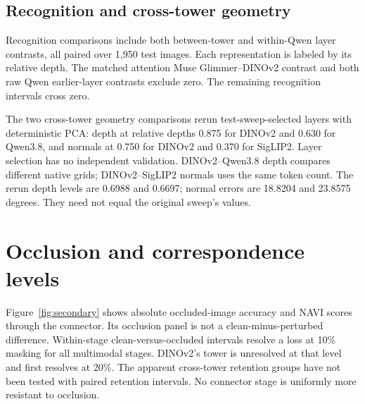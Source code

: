 \begin{table}[H]
\centering\small
\caption{KITTI projected-versus-tower differences.}
\label{tab:kitti}

\end{table}
\begin{table}[H]
\centering\small
\caption{NAVI projected-versus-tower differences.}

\end{table}
\begin{table}[H]
\centering\small
\caption{ScanNet projected-versus-tower differences.}

\end{table}
\begin{table}[H]
\centering\small
\caption{SPair-71k projected-versus-tower differences.}

\end{table}

\subsection{Recognition and cross-tower geometry}
Recognition comparisons include both between-tower and within-Qwen layer contrasts,
all paired over 1,950 test images. Each representation is labeled by its relative depth.
The matched attention Muse Glimmer--DINOv2 contrast and both raw Qwen earlier-layer
contrasts exclude zero. The remaining recognition intervals cross zero.

\begin{table}[H]
\centering\scriptsize
\caption{Recognition differences, first minus second top-1 accuracy.}

\end{table}

The two cross-tower geometry comparisons rerun test-sweep-selected layers with
deterministic PCA: depth at relative depths 0.875 for DINOv2 and 0.630 for Qwen3.8,
and normals at 0.750 for DINOv2 and 0.370 for SigLIP2. Layer selection has no independent
validation. DINOv2--Qwen3.8 depth compares different native grids; DINOv2--SigLIP2 normals
uses the same token count. The rerun depth levels are 0.6988 and 0.6697; normal errors
are 18.8204 and 23.8575 degrees. They need not equal the original sweep's values.

\begin{table}[H]
\centering\small
\caption{Cross-tower geometry advantages under deterministic matched reruns.}

\end{table}

\section{Occlusion and correspondence levels}
\label{app:secondary}
Figure~\ref{fig:secondary} shows absolute occluded-image accuracy and NAVI scores through
the connector. Its occlusion panel is not a clean-minus-perturbed difference.
Within-stage clean-versus-occluded intervals resolve a loss at 10\% masking for all
multimodal stages. DINOv2's tower is unresolved at that level and first resolves at
20\%. The apparent cross-tower retention groups have not been tested with paired
retention intervals. No connector stage is uniformly more resistant to occlusion.


